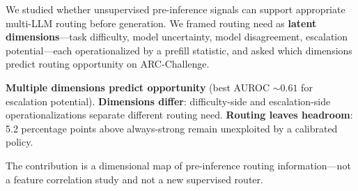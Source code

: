
We studied whether unsupervised pre-inference signals can support appropriate multi-LLM routing before generation.
We framed routing need as \textbf{latent dimensions}---task difficulty, model uncertainty, model disagreement, escalation potential---each operationalized by a prefill statistic, and asked which dimensions predict routing opportunity on ARC-Challenge.

\textbf{Multiple dimensions predict opportunity} (best AUROC ${\sim}0.61$ for escalation potential).
\textbf{Dimensions differ}: difficulty-side and escalation-side operationalizations separate different routing need.
\textbf{Routing leaves headroom}: 5.2 percentage points above always-strong remain unexploited by a calibrated policy.

The contribution is a dimensional map of pre-inference routing information---not a feature correlation study and not a new supervised router.
